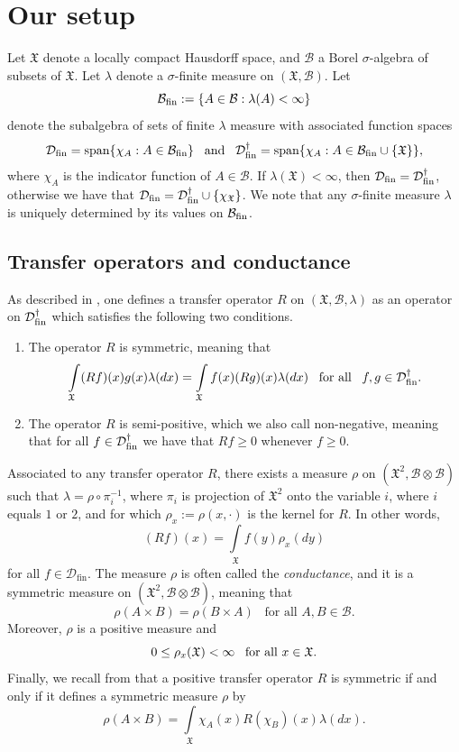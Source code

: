 \documentclass[11pt,reqno]{amsart}
\theoremstyle{remark}
\theoremstyle{definition}
\numberwithin{theorem}{section} \numberwithin{equation}{section}
\newcommand{\B}{\mathcal{B}}
\newcommand{\D}{\mathcal{D}}
\newcommand{\X}{\mathfrak{X}}
\begin{document}
\medskip
\section{Our setup}\label{sec. setup}

Let $\mathfrak{X}$ denote a locally compact Hausdorff space, and $\mathcal{B}$ a Borel $\sigma$-algebra of subsets of $\X$.
Let $\lambda$ denote a $\sigma$-finite measure on $(\X,\mathcal{B})$. Let
$$
\mathcal{B}_{\rm fin}:=\{A\in \B: \lambda (A)<\infty\}
$$
denote the subalgebra of sets of finite $\lambda$ measure with associated function spaces
$$
\D_{\rm fin}=\text{span}\{\chi_A: A\in \mathcal{B}_{\rm fin}\}
\,\,\,\,\,
\text{\rm and}
\,\,\,\,\,
\D_{\rm fin}^{\dagger}=\text{span}\{\chi_A: A\in \mathcal{B}_{\rm fin}\cup \{\X\}\},
$$
where $\chi_{A}$ is the indicator function of $A \in \mathcal{B}$.
If $\lambda(\X)<\infty$, then $\D_{\rm fin}=\D_{\rm fin}^{\dagger}$, otherwise we have
that $\D_{\rm fin}=\D_{\rm fin}^{\dagger} \cup \{\chi_{\X}\}$.
We note that any $\sigma$-finite measure $\lambda$ is uniquely determined by its values on $\mathcal{B}_{\rm fin}$.

\medskip
\subsection{Transfer operators and conductance}
As described in \cite{JP19}, one defines a transfer operator $R$ on
$(\X,\mathcal{B},\lambda)$ as an operator on $\D_{\rm fin}^{\dagger}$ which satisfies
the following two conditions.

\begin{enumerate}[leftmargin=0.75in]
  \item  The operator $R$ is symmetric, meaning that
  $$
  \int\limits_{\X}(Rf)(x)g(x)\lambda(dx)=\int\limits_{\X}f(x)(Rg)(x)\lambda(dx)
  \,\,\,\,\,
  \text{\rm for all}
  \,\,\,\,\,
  f,g\in \D_{\rm fin}^{\dagger}.
  $$
  \item The operator $R$ is semi-positive, which we also call non-negative, meaning that for all $f\in \D_{\rm fin}^{\dagger}$ we have
that  $Rf\geq0$ whenever  $f\geq 0$.
\end{enumerate}

\medskip
\noindent
Associated to any transfer operator $R$, there exists a measure $\rho$
 on $(\X^2,\mathcal{B}\otimes \mathcal{B})$ such that $\lambda=\rho\circ \pi_i^{-1}$, where $\pi_i$ is projection of $\X^2$
  onto the variable $i$, where $i$ equals $1$ or $2$,  and for which $\rho_x:=\rho(x,\cdot)$ is the kernel for $R$.  In other words,
 $$
 (Rf)(x)=\int\limits_{\X}f(y)\rho_x(dy)
 $$
 for all $f\in \mathcal{D}_{\mathrm{fin}}$.
The measure $\rho$ is often called the \emph{conductance}, and it is a symmetric measure on $(\X^2, \mathcal{B}\otimes \mathcal{B})$, meaning that
$$
\rho(A\times B)=\rho(B\times A)
\,\,\,\,\,
\text{for all $A,B\in\mathcal{B}$.}
$$
Moreover, $\rho$ is a positive measure and
$$
0\leq \rho_x(\X)<\infty
\,\,\,\,\,
\text{\rm for all $x\in\X$.}
$$
Finally, we recall from \cite{BJ23} that a positive transfer operator $R$ is symmetric if and only if it defines a symmetric measure $\rho$ by
$$
\rho(A\times B)=\int\limits_{\X}\chi_A(x)R(\chi_B)(x)\lambda(dx).
$$
\end{document}
